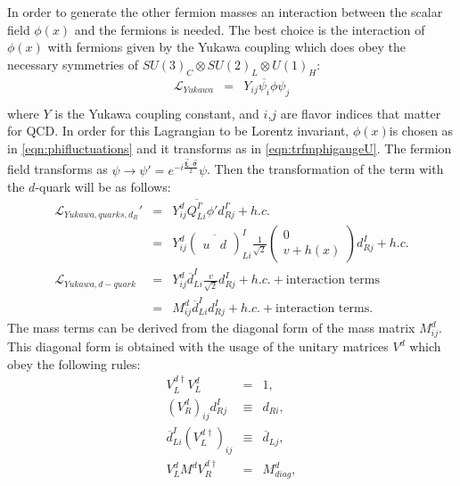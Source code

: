 In order to generate the other fermion masses an interaction between the scalar field $\phi(x)$ and the fermions is needed. The best choice is the interaction of $\phi(x)$ with fermions given by the Yukawa coupling \cite{noteskooijman11} which does obey the necessary symmetries of $SU(3)_C \otimes SU(2)_L \otimes U(1)_H$:
\begin{eqnarray}
\mathcal L_{Yukawa} &=& Y_{ij}\overline{\psi_{i}}\phi\psi_{j}\\
\label{eqn:SMLYukawa}
\end{eqnarray}
where $Y$ is the Yukawa coupling constant, and $i$,$j$ are flavor indices that matter for QCD.
In order for this Lagrangian to be Lorentz invariant, $\phi(x)$is chosen as in \autoref{eqn:phifluctuations} and it transforms as in \autoref{eqn:trfmphigaugeU}. The fermion field transforms as $\psi \rightarrow \psi' = e^{-i\frac{\boldsymbol{\vec{\xi}\cdot\vec{\sigma}}}{2}} \psi$. Then the transformation of the term with the $d$-quark will be as follows:
\begin{eqnarray}
\mathcal L_{Yukawa,quarks,d_R}' &=&  Y^d_{ij}\overline{Q^{I'}_{Li}}\phi' d^{I'}_{Rj} + h.c. \nonumber \\
&=& Y^d_{ij}  \left( \overline{ \begin{array}{cc} u & d \end{array} } \right)^I_{Li}  \frac{1}{\sqrt{2}} \left( \begin{array}{c} 0 \\ v + h(x)\end{array} \right)  d^I_{Rj} + h.c.\nonumber \\
\mathcal L_{Yukawa,d-quark} &=&  Y^d_{ij}   \overline{d}^I_{Li} \frac{v}{\sqrt{2}} d^I_{Rj}  + h.c. + \mbox{interaction terms} \nonumber \\
&=& M^d_{ij}\overline{d}^I_{Li}d^I_{Rj} + h.c. + \mbox{interaction terms}.
\label{eqn:SMLYukawaDquark}
\end{eqnarray}
The mass terms can be derived from the diagonal form of the mass matrix $M^d_{ij}$. This diagonal form is obtained with the usage of the unitary matrices $V^d$ which obey the following rules:
\begin{eqnarray}
V_L^{d\dag}V_L^d &=&  1,\\
(V^d_R)_{ij}d^I_{Rj} &\equiv& d_{Ri}, \\
\overline{d}_{Li}^I (V_L^{d\dag})_{ij} &\equiv& \overline{d}_{Lj}, \\
V^{d}_L M^d V^{d\dag}_R &=&  M^d_{diag},
\label{eqn:diagonalizingMmatrix}
\end{eqnarray}
